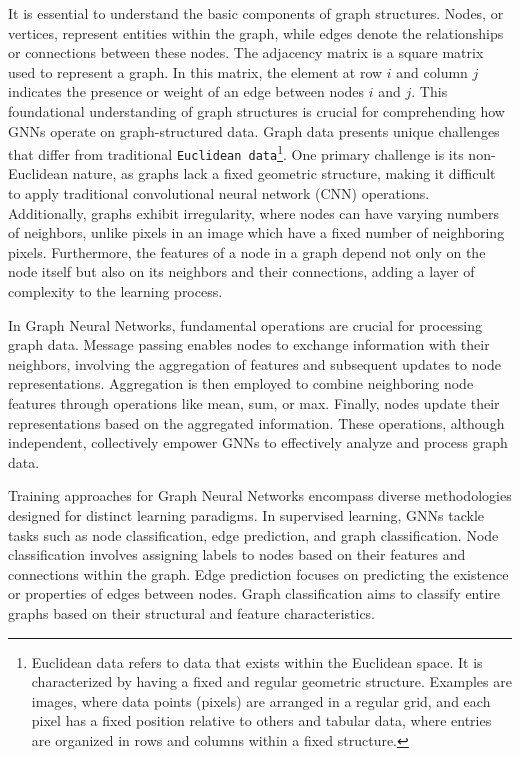 It is essential to understand the basic components of graph structures. Nodes, or vertices, represent entities within the graph, while edges denote the relationships or connections between these nodes. The adjacency matrix is a square matrix used to represent a graph. In this matrix, the element at row $i$ and column $j$ indicates the presence or weight of an edge between nodes $i$ and $j$. This foundational understanding of graph structures is crucial for comprehending how GNNs operate on graph-structured data.
Graph data presents unique challenges that differ from traditional \verb+Euclidean data+\footnote{
Euclidean data refers to data that exists within the Euclidean space. It is characterized by having a fixed and regular geometric structure. Examples are images, where data points (pixels) are arranged in a regular grid, and each pixel has a fixed position relative to others and tabular data, where entries are organized in rows and columns within a fixed structure.
}. One primary challenge is its non-Euclidean nature, as graphs lack a fixed geometric structure, making it difficult to apply traditional convolutional neural network (CNN) operations. Additionally, graphs exhibit irregularity, where nodes can have varying numbers of neighbors, unlike pixels in an image which have a fixed number of neighboring pixels. Furthermore, the features of a node in a graph depend not only on the node itself but also on its neighbors and their connections, adding a layer of complexity to the learning process.

In Graph Neural Networks, fundamental operations are crucial for processing graph data. Message passing enables nodes to exchange information with their neighbors, involving the aggregation of features and subsequent updates to node representations. Aggregation is then employed to combine neighboring node features through operations like mean, sum, or max. Finally, nodes update their representations based on the aggregated information. These operations, although independent, collectively empower GNNs to effectively analyze and process graph data.

Training approaches for Graph Neural Networks encompass diverse methodologies designed for distinct learning paradigms. \cite{DBLP:journals/corr/abs-1812-08434} In supervised learning, GNNs tackle tasks such as node classification, edge prediction, and graph classification. Node classification involves assigning labels to nodes based on their features and connections within the graph. Edge prediction focuses on predicting the existence or properties of edges between nodes. Graph classification aims to classify entire graphs based on their structural and feature characteristics.


